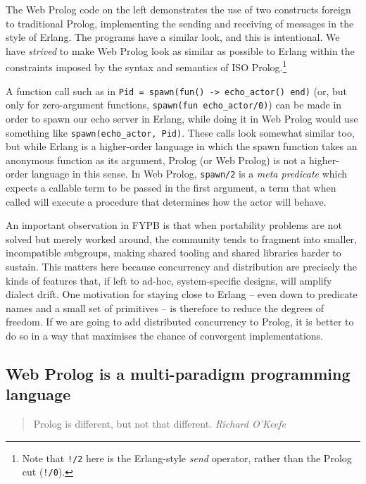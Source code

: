 \noindent The Web Prolog code on the left demonstrates the use of two constructs foreign to traditional Prolog, implementing the sending and receiving of messages in the style of Erlang. The programs have a similar look, and this is intentional. We have \textit{strived} to make Web Prolog look as similar as possible to Erlang within the constraints imposed by the syntax and semantics of ISO Prolog.\footnote{Note that \texttt{!/2} here is the Erlang-style \textit{send} operator, rather than the Prolog cut (\texttt{!/0}).} 

A function call such as in \texttt{Pid\,=\,spawn(fun()\,->\,echo\_actor()\,end)} (or, but only for zero-argument functions, \texttt{spawn(fun echo\_actor/0)}) can be made in order to spawn our echo server in Erlang, while doing it in Web Prolog would use something like \texttt{spawn(echo\_actor,\,Pid)}. These calls look somewhat similar too, but while Erlang is a higher-order language in which the spawn function takes an anonymous function as its argument, Prolog (or Web Prolog) is not a higher-order language in this sense. In Web Prolog, \texttt{spawn/2} is a \textit{meta predicate} which expects a callable term to be passed in the first argument, a term that when called will execute a procedure that determines how the actor will behave.

\medskip
\noindent An important observation in FYPB is that when portability problems are not solved but merely worked around, the community tends to fragment into smaller, incompatible subgroups, making shared tooling and shared libraries harder to sustain. This matters here because concurrency and distribution are precisely the kinds of features that, if left to ad-hoc, system-specific designs, will amplify dialect drift. One motivation for staying close to Erlang -- even down to predicate names and a small set of primitives -- is therefore to reduce the degrees of freedom. If we are going to add distributed concurrency to Prolog, it is better to do so in a way that maximises the chance of convergent implementations.


\subsection{Web Prolog is a multi-paradigm programming language}\label{sec:p-language}

\begin{quote}
\flushright Prolog is different, but not that different.
\vspace{-0.2cm}
\flushright \textit{Richard O'Keefe}
\end{quote}
\vspace{0.2cm}

